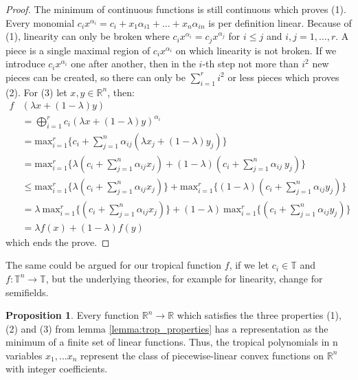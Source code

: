 \documentclass{article}
\theoremstyle{definition}
\newtheorem{proposition}[theorem]{Proposition}
\begin{document}
\begin{proof}
The minimum of continuous functions is still continuous which proves (1). Every monomial $c_ix^{\alpha_i} = c_i + x_{1}\alpha_{i1} + \dots + x_n \alpha_{in}$ is per definition linear. Because of (1), linearity can only be broken where $c_i x^{\alpha_i} = c_j x^{\alpha_j}$ for $i \leq j$ and $i,j = 1, \dots ,r$. A piece is a single maximal region of $c_ix^{\alpha_i}$ on which linearity is not broken. If we introduce $c_ix^{\alpha_i}$ one after another, then in the $i$-th step not more than $i^2$ new pieces can be created, so there can only be $ \sum_{i=1}^{r} i^2$ or less pieces which proves (2). 
For (3) let $x, y \in \mathbb{R}^{n}$, then:
\begin{align*}
f&(\lambda x + (1-\lambda)y) \\
&= \bigoplus^{r}_{i=1} c_{i}(\lambda x + (1-\lambda) y)^{\alpha_{i}} \\
&= \text{max}^{r}_{i=1} \{ c_{i} + \sum_{j=1}^{n} \alpha_{ij}(\lambda x_{j} + (1-\lambda) y_{j}) \} \\
&= \text{max}^{r}_{i=1} \{ \lambda (c_{i} + \sum_{j=1}^{n}\alpha_{ij}x_{j}) + (1-\lambda) (c_{i} + \sum_{j=1}^{n}\alpha_{ij} \ y_{j})\} \\
&\leq \text{max}^{r}_{i=1} \{ \lambda (c_{i} + \sum_{j=1}^{n}\alpha_{ij}x_{j}) \} + \text{max}^{r}_{i=1} \{ (1-\lambda) (c_{i} + \sum_{j=1}^{n}\alpha_{ij}y_{j}) \} \\
&= \lambda \ \text{max}^{r}_{i=1} \{ (c_{i} + \sum_{j=1}^{n}\alpha_{ij}x_{j}) \} + (1-\lambda) \ \text{max}^{r}_{i=1} \{ (c_{i} + \sum_{j=1}^{n}\alpha_{ij}y_{j}) \} \\
&= \lambda f(x) + (1-\lambda) f(y)
\end{align*}
which ends the prove.
\end{proof}

The same could be argued for our tropical function $f$, if we let $c_{i} \in \mathbb{T}$ and $f:\mathbb{T}^{n} \to \mathbb{T}$, but the underlying theories, for example for linearity, change for semifields\cite{olia2020analysis}.

\begin{proposition}
Every function $\mathbb{R}^{n} \to \mathbb{R}$ which satisfies the three properties (1), (2) and (3) from lemma 	\ref{lemma:trop_properties} has a representation as the minimum of a finite set of linear functions. Thus, the tropical polynomials in n variables $x_{1}, \dots x_{n}$ represent the class of piecewise-linear convex functions on $\mathbb{R}^{n}$ with integer coefficients.
\end{proposition}
\end{document}
